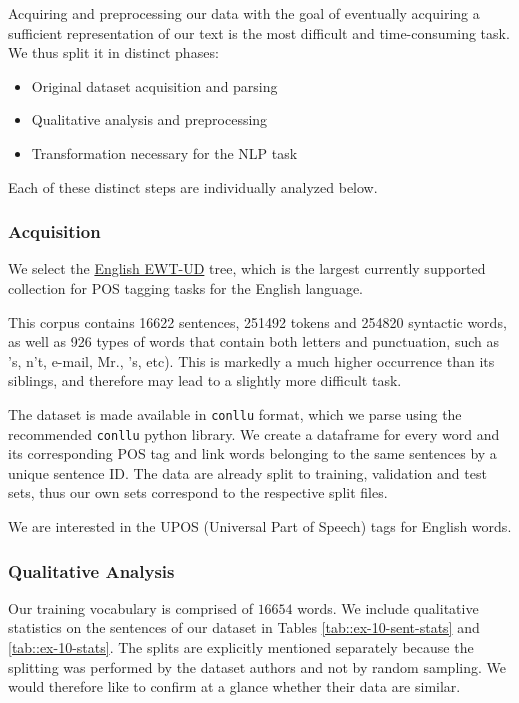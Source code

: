 \documentclass[10pt, a4paper]{article}
\begin{document}
	Acquiring and preprocessing our data with the goal of eventually acquiring a sufficient representation of our text is the most difficult and time-consuming task. We thus split it in distinct phases:
	
	\begin{itemize}
		\item Original dataset acquisition and parsing
		\item Qualitative analysis and preprocessing
		\item Transformation necessary for the NLP task
	\end{itemize}
	
	Each of these distinct steps are individually analyzed below.
	
	
	\subsubsection{Acquisition}
	
	We select the \href{https://universaldependencies.org/treebanks/en_ewt/index.html}{English EWT-UD} tree, which is the largest currently supported collection for POS tagging tasks for the English language.
	
	This corpus contains 16622 sentences, 251492 tokens and 254820 syntactic words, as well as 926 types of words that contain both letters and punctuation, such as 's, n't, e-mail, Mr., ’s, etc). This is markedly a much higher occurrence than its siblings, and therefore may lead to a slightly more difficult task.
	
	The dataset is made available in \texttt{conllu} format, which we parse using the recommended \texttt{conllu} python library. We create a dataframe for every word and its corresponding POS tag and link words belonging to the same sentences by a unique sentence ID. The data are already split to training, validation and test sets, thus our own sets correspond to the respective split files.
	
	We are interested in the UPOS (Universal Part of Speech) tags for English words.
	
	\subsubsection{Qualitative Analysis}
	
	Our training vocabulary is comprised of $16654$ words. We include qualitative statistics on the sentences of our dataset in Tables \ref{tab::ex-10-sent-stats} and \ref{tab::ex-10-stats}. The splits are explicitly mentioned separately because the splitting was performed by the dataset authors and not by random sampling. We would therefore like to confirm at a glance whether their data are similar.
	
\end{document}
